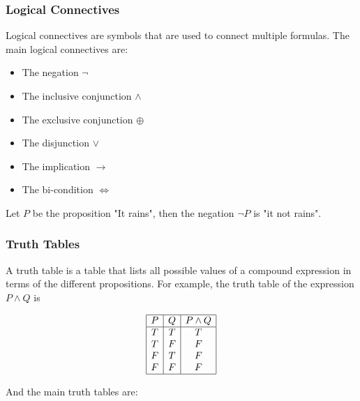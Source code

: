 \documentclass{article}
\begin{document}
\subsubsection{Logical Connectives}
Logical connectives are symbols that are used to connect multiple formulas. The main logical connectives are:
\begin{itemize}
\item The negation $ \neg $
\item The inclusive conjunction $ \wedge $
\item The exclusive conjunction $ \oplus $
\item The disjunction $ \vee $
\item The implication $ \rightarrow $
\item The bi-condition $ \Leftrightarrow $
\end{itemize}
Let $ P $ be the proposition "It rains", then the negation $ \neg P $ is "it not rains".

\subsubsection{Truth Tables}
A truth table is a table that lists all possible values of a compound expression in terms of the different propositions. For example, the truth table of the expression $ P \wedge Q $ is
\renewcommand{\arraystretch}{1.5} %
\begin{center} %
\[ %
\begin{array}{|c|c|c|} \hline %
P & Q & P \wedge Q\\ \hline
T & T & T\\
T & F & F\\
F & T & F\\
F & F & F\\
\hline
\end{array} %
\] %
\end{center}
And the main truth tables are:
\end{document}

